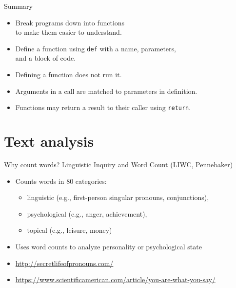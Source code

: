 \documentclass[aspectratio=169,usenames,dvipsnames]{beamer}
\begin{document}
\begin{frame}{Summary}
    \begin{itemize}
        \item Break programs down into functions \\
            to make them easier to understand.
        \item Define a function using \texttt{def} with a name, parameters,\\
            and a block of code.
        \item Defining a function does not run it.
        \item Arguments in a call are matched to parameters in definition.
        \item Functions may return a result to their caller using \texttt{return}.
    \end{itemize}
\end{frame}





\section{Text analysis}
\frame{\tableofcontents[currentsection]}

\begin{frame}{Why count words?}
    Linguistic Inquiry and Word Count (LIWC, Pennebaker)
    \begin{itemize}
        \item Counts words in 80 categories:
            \begin{itemize}
            \item linguistic (e.g., first-person singular pronouns, conjunctions),
            \item psychological (e.g., anger, achievement),
            \item topical (e.g., leisure, money)
            \end{itemize}
        \item Uses word counts to analyze personality or psychological state
        \item \url{http://secretlifeofpronouns.com/}
        \item \url{https://www.scientificamerican.com/article/you-are-what-you-say/}
    \end{itemize}
\end{frame}
\end{document}
